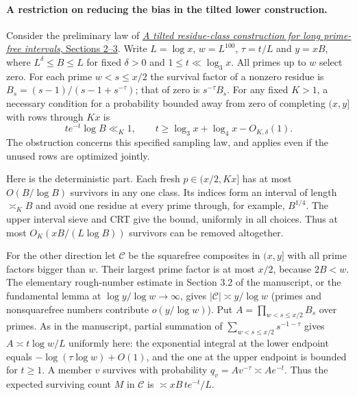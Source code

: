 \documentclass[11pt]{article}
\begin{document}
\paragraph{A restriction on reducing the bias in the tilted lower construction.}
Consider the preliminary law of
\href{https://github.com/DottedCalculator/ai-math/blob/main/Erdos_4_GPT_5.6_Sol.pdf}
{\emph{A tilted residue-class construction for long prime-free intervals},
Sections 2--3}. Write $L=\log x$, $w=L^{100}$, $\tau=t/L$ and
$y=xB$, where $L^\delta\le B\le L$ for fixed $\delta>0$ and
$1\le t\ll\log_3 x$. All primes up to $w$ select zero. For each prime
$w<s\le x/2$ the survival factor of a nonzero residue is
$B_s=(s-1)/(s-1+s^{-\tau})$; that of zero is $s^{-\tau}B_s$.
For any fixed $K>1$, a necessary condition for a probability bounded
away from zero of completing $(x,y]$ with rows through $Kx$ is
\[
       t e^{-t}\log B\ll_K 1,\qquad
       t\ge \log_3 x+\log_4 x-O_{K,\delta}(1).
\]
The obstruction concerns this specified sampling law, and applies
even if the unused rows are optimized jointly.

Here is the deterministic part. Each fresh $p\in(x/2,Kx]$ has at
most $O(B/\log B)$ survivors in any one class. Its indices form an
interval of length $\asymp_K B$ and avoid one residue at every
prime through, for example, $B^{1/4}$. The upper interval sieve
and CRT give the bound, uniformly in all choices. Thus at most
$O_K(xB/(L\log B))$ survivors can be removed altogether.

For the other direction let $\mathcal C$ be the squarefree composites
in $(x,y]$ with all prime factors bigger than $w$. Their largest
prime factor is at most $x/2$, because $2B<w$. The elementary
rough-number estimate in Section 3.2 of the manuscript, or the
fundamental lemma at $\log y/\log w\to\infty$, gives
$|\mathcal C|\asymp y/\log w$ (primes and nonsquarefree numbers
contribute $o(y/\log w)$). Put $A=\prod_{w<s\le x/2}B_s$ over primes.
As in the manuscript, partial summation of
$\sum_{w<s\le x/2}s^{-1-\tau}$ gives $A\asymp t\log w/L$
uniformly here: the exponential integral at the lower endpoint
equals $-\log(\tau\log w)+O(1)$, and the one at the upper endpoint
is bounded for $t\ge1$. A member $v$ survives with probability
$q_v=A v^{-\tau}\asymp A e^{-t}$. Thus the expected surviving
count $M$ in $\mathcal C$ is $\asymp xB\,t e^{-t}/L$.
\end{document}
